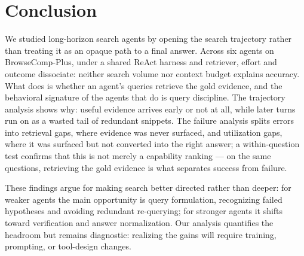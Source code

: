 \section{Conclusion}
\label{sec:conclusion}

We studied long-horizon search agents by opening the search trajectory rather than treating it as an opaque path to a final answer. Across six agents on BrowseComp-Plus, under a shared ReAct harness and retriever, effort and outcome dissociate: neither search volume nor context budget explains accuracy. What does is whether an agent's queries retrieve the gold evidence, and the behavioral signature of the agents that do is query discipline. The trajectory analysis shows why: useful evidence arrives early or not at all, while later turns run on as a wasted tail of redundant snippets. The failure analysis splits errors into retrieval gaps, where evidence was never surfaced, and utilization gaps, where it was surfaced but not converted into the right answer; a within-question test confirms that this is not merely a capability ranking --- on the same questions, retrieving the gold evidence is what separates success from failure.

These findings argue for making search better directed rather than deeper: for weaker agents the main opportunity is query formulation, recognizing failed hypotheses and avoiding redundant re-querying; for stronger agents it shifts toward verification and answer normalization. Our analysis quantifies the headroom but remains diagnostic: realizing the gains will require training, prompting, or tool-design changes.


